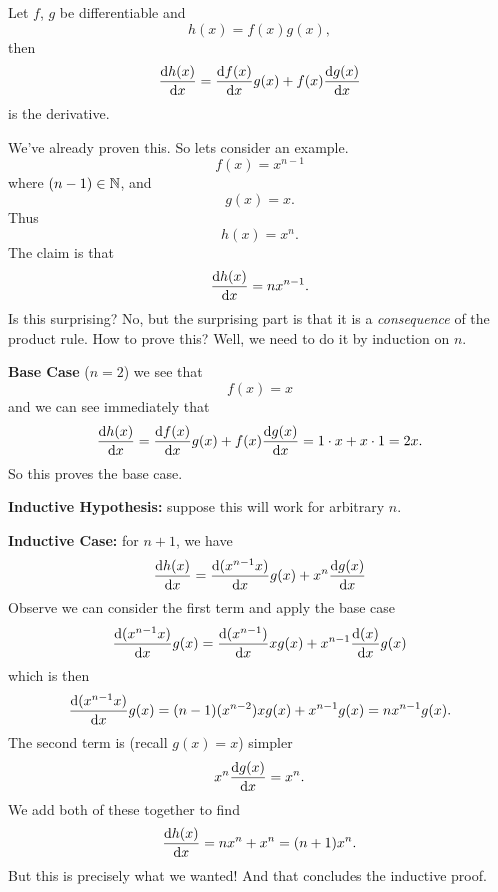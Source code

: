 \begin{thm}
Let $f$, $g$ be differentiable and
\begin{equation}
h(x)=f(x)g(x),
\end{equation}
then
\begin{equation}
\frac{\mathrm{d} h(x)}{\mathrm{d} x}=\frac{\mathrm{d} f(x)}{\mathrm{d} x}g(x)+f(x)\frac{\mathrm{d} g(x)}{\mathrm{d} x}
\end{equation}
is the derivative.
\end{thm}

We've already proven this. So lets consider an example.
\begin{equation}
f(x)=x^{n-1}
\end{equation}
where $(n-1)\in\mathbb{N}$, and
\begin{equation}
g(x)=x.
\end{equation}
Thus
\begin{equation}
h(x)=x^{n}.
\end{equation}
The claim is that
\begin{equation}
\frac{\mathrm{d} h(x)}{\mathrm{d} x}=nx^{n-1}.
\end{equation}
Is this surprising? No, but the surprising part is that it is a
\emph{consequence} of the product rule. How to prove this? Well,
we need to do it by induction on $n$. 

\textbf{Base Case} ($n=2$) we see that
\begin{equation}
f(x)=x
\end{equation}
and we can see immediately that
\begin{equation}
\frac{\mathrm{d} h(x)}{\mathrm{d} x}=\frac{\mathrm{d} f(x)}{\mathrm{d} x}g(x)+f(x)\frac{\mathrm{d} g(x)}{\mathrm{d} x}=1\cdot x+x\cdot 1=2x.
\end{equation}
So this proves the base case.

\textbf{Inductive Hypothesis:} suppose this will work for
arbitrary $n$.

\textbf{Inductive Case:} for $n+1$, we have
\begin{equation}
\frac{\mathrm{d} h(x)}{\mathrm{d} x}=\frac{\mathrm{d} (x^{n-1}x)}{\mathrm{d} x}g(x)+x^{n}\frac{\mathrm{d} g(x)}{\mathrm{d} x}
\end{equation}
Observe we can consider the first term and apply the base case
\begin{equation}
\frac{\mathrm{d} (x^{n-1}x)}{\mathrm{d} x}g(x)=\frac{\mathrm{d} (x^{n-1})}{\mathrm{d} x}xg(x)+x^{n-1}\frac{\mathrm{d} (x)}{\mathrm{d} x}g(x)
\end{equation}
which is then
\begin{equation}
\frac{\mathrm{d} (x^{n-1}x)}{\mathrm{d} x}g(x)=(n-1)(x^{n-2})xg(x)+x^{n-1}g(x)=nx^{n-1}g(x).
\end{equation}
The second term is (recall $g(x)=x$) simpler
\begin{equation}
x^{n}\frac{\mathrm{d} g(x)}{\mathrm{d} x}=x^{n}.
\end{equation}
We add both of these together to find
\begin{equation}
\frac{\mathrm{d} h(x)}{\mathrm{d} x}=nx^{n}+x^{n}=(n+1)x^{n}.
\end{equation}
But this is precisely what we wanted! And that concludes the inductive proof.

